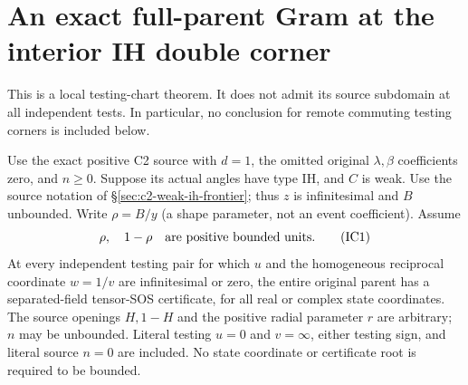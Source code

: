 \section[An exact full-parent Gram at the interior IH double corner]{An exact full-parent Gram at the interior IH double corner}
\label{sec:c2-weak-ih-interior-corner}

This is a local testing-chart theorem. It does not admit its source
subdomain at all independent tests. In particular, no conclusion for
remote commuting testing corners is included below.

\begin{theorem}
Use the exact positive C2 source with $d=1$, the omitted original
$\lambda,\beta$ coefficients zero, and $n\ge0$. Suppose its actual
angles have type IH, and $C$ is weak. Use the source notation of
\S\ref{sec:c2-weak-ih-frontier}; thus $z$ is infinitesimal and
$B$ unbounded. Write $\rho=B/y$ (a shape parameter, not an event
coefficient). Assume
\[
 \rho,\quad1-\rho
 \quad\hbox{are positive bounded units}.                 \tag{IC1}
\]
At every independent testing pair for which $u$ and the homogeneous
reciprocal coordinate $w=1/v$ are infinitesimal or zero, the entire
original parent has a separated-field tensor-SOS certificate, for
all real or complex state coordinates. The source openings $H,1-H$ and the positive radial parameter $r$
are arbitrary; $n$ may be unbounded. Literal
testing $u=0$ and $v=\infty$, either testing sign, and literal source
$n=0$ are included.
No state coordinate or certificate root is required to be bounded.
\end{theorem}

